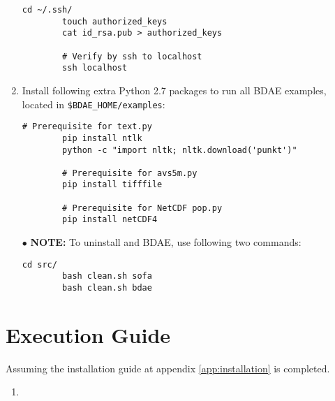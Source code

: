 \begin{enumerate}
	\begin{lstlisting}[numbers=none, backgroundcolor=\color{sourcebackground}, rulecolor=\color{sourcebackground}, framextopmargin=5pt, framexbottommargin=5pt, frame=tb, xrightmargin=15pt, commentstyle=\color{bashcommetcolor}]
		cd ~/.ssh/
		touch authorized_keys
		cat id_rsa.pub > authorized_keys
		
		# Verify by ssh to localhost
		ssh localhost
	\end{lstlisting}
	\vspace*{-6mm}
	\item Install following extra Python 2.7 packages to run all BDAE examples, located in \texttt{\$BDAE\_HOME/examples}:

	\begin{lstlisting}[numbers=none, backgroundcolor=\color{sourcebackground}, rulecolor=\color{sourcebackground}, framextopmargin=5pt, framexbottommargin=5pt, frame=tb, xrightmargin=15pt, commentstyle=\color{bashcommetcolor}, showstringspaces=false]
		# Prerequisite for text.py
		pip install ntlk
		python -c "import nltk; nltk.download('punkt')"
		
		# Prerequisite for avs5m.py
		pip install tifffile
		
		# Prerequisite for NetCDF pop.py
		pip install netCDF4
	\end{lstlisting}
	\vspace*{-6mm}
	\item[$\bullet$] {\sffamily\textbf{NOTE:}} To uninstall \CodeName and BDAE, use following two commands:
	\begin{lstlisting}[numbers=none, backgroundcolor=\color{sourcebackground}, rulecolor=\color{sourcebackground}, framextopmargin=5pt, framexbottommargin=5pt, frame=tb, xrightmargin=15pt, commentstyle=\color{bashcommetcolor}, showstringspaces=false]
		cd src/
		bash clean.sh sofa
		bash clean.sh bdae		
	\end{lstlisting}
\end{enumerate}


\chapter{Execution Guide} \label{app:execution}
Assuming the installation guide at appendix \ref{app:installation} is completed.

\begin{enumerate}
	\item 
\end{enumerate}